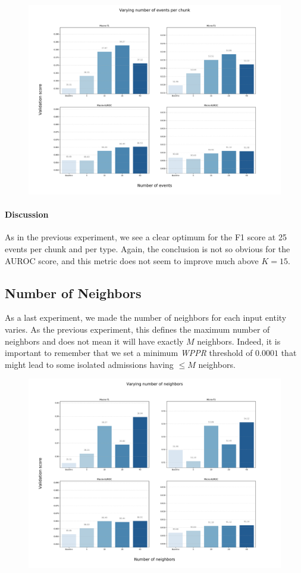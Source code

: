 \begin{figure}[H]
 \centering
 \includegraphics[width=\textwidth]{figures/exp-events.pdf}
\end{figure}
\paragraph{Discussion} As in the previous experiment, we see a clear optimum for the F1 score at 25 events per chunk and per type. Again, the conclusion is not so obvious for the AUROC score, and this metric does not seem to improve much above $K=15$.

\newpage
\subsection{Number of Neighbors}
As a last experiment, we made the number of neighbors for each input entity varies. As the previous experiment, this defines the maximum number of neighbors and does not mean it will have exactly $M$ neighbors. Indeed, it is important to remember that we set a minimum \emph{WPPR} threshold of $0.0001$ that might lead to some isolated admissions having $\leq M$ neighbors.

\begin{figure}[H]
 \centering
 \includegraphics[width=\textwidth]{figures/exp-neighbors.pdf}
\end{figure}

